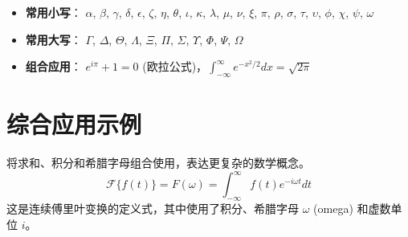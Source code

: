 \documentclass{article}
\begin{document}
\begin{itemize}
    \item \textbf{常用小写}：
    $\alpha$, $\beta$, $\gamma$, $\delta$, $\epsilon$, $\zeta$, $\eta$, $\theta$, $\iota$, $\kappa$, $\lambda$, $\mu$, $\nu$, $\xi$, $\pi$, $\rho$, $\sigma$, $\tau$, $\upsilon$, $\phi$, $\chi$, $\psi$, $\omega$
    \item \textbf{常用大写}：
    $\Gamma$, $\Delta$, $\Theta$, $\Lambda$, $\Xi$, $\Pi$, $\Sigma$, $\Upsilon$, $\Phi$, $\Psi$, $\Omega$
    \item \textbf{组合应用}：
    $ e^{i\pi} + 1 = 0 $ (欧拉公式)，$ \int_{-\infty}^{\infty} e^{-x^2/2} dx = \sqrt{2\pi} $
\end{itemize}

\section{综合应用示例}
将求和、积分和希腊字母组合使用，表达更复杂的数学概念。
\[
\mathcal{F}\{f(t)\} = F(\omega) = \int_{-\infty}^{\infty} f(t) e^{-i\omega t} dt
\]
这是连续傅里叶变换的定义式，其中使用了积分、希腊字母 $\omega$ (omega) 和虚数单位 $i$。
\end{document}
